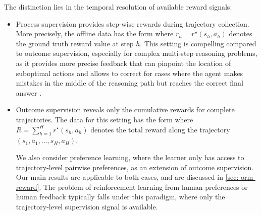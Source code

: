 \documentclass{article}
\newcommand{\arxiv}[1]{\iftoggle{icml}{}{#1}}
\newcommand{\icml}[1]{\iftoggle{icml}{#1}{}}
\begin{document}
The distinction lies in the temporal resolution of available reward signals:
\begin{itemize}
    \item Process supervision provides step-wise rewards during trajectory collection. More precisely, the offline data has the form
    \icml{\begin{small}
    \begin{align}
    \label{eq:def-prm-data}
    \Dcal_P \coloneqq\{(s_1, a_1, r_1, s_2, a_2, r_2, \cdots, s_H, a_H, r_H)\},
    \end{align}
    \end{small}}
    \arxiv{\begin{align}
    \label{eq:def-prm-data}
    \Dcal_P \coloneqq\{(s_1, a_1, r_1^\star, s_2, a_2, r_2^\star, \cdots, s_H, a_H, r_H^\star)\},
    \end{align}}
    where $r_h = r^\star(s_h, a_h)$ denotes the ground truth reward value at step $h$. 
    This setting is compelling compared to outcome supervision, especially for complex multi-step reasoning problems, as it provides more precise feedback that can pinpoint the  location of suboptimal actions and allows to correct for cases where the agent makes mistakes in the middle of the reasoning path but reaches the correct final answer \citep{uesato2022solving,lightman2023let}.

    \item Outcome supervision reveals only the cumulative rewards for complete trajectories. The data for this setting has the form
    \icml{\begin{small}
    \begin{align}
    \label{eq:def-orm-data}
    \Dcal_O \coloneqq\{(s_1, a_1, s_2, a_2, \cdots, s_H, a_H, R)\},
    \end{align}
    \end{small}}
    \arxiv{\begin{align}
    \label{eq:def-orm-data}
    \Dcal_O \coloneqq\{(s_1, a_1, s_2, a_2, \cdots, s_H, a_H, R)\},
    \end{align}}
    where $R = \sum_{h=1}^H r^\star(s_h, a_h)$ denotes the total reward along the trajectory $(s_1,a_1,...,s_H,a_H)$.
    
    We also consider  preference learning,  where the learner only has access to trajectory-level pairwise preferences, as an extension of outcome supervision. Our main results are applicable to both cases, and are discussed in \cref{sec: orm-reward}. The problem of  reinforcement learning from human preferences  \citep[e.g.,][]{christiano2017deep} or human feedback \citep[e.g.,][]{ouyang2022training} typically falls under this paradigm, where only the trajectory-level supervision signal is available.
\end{itemize}
\end{document}
